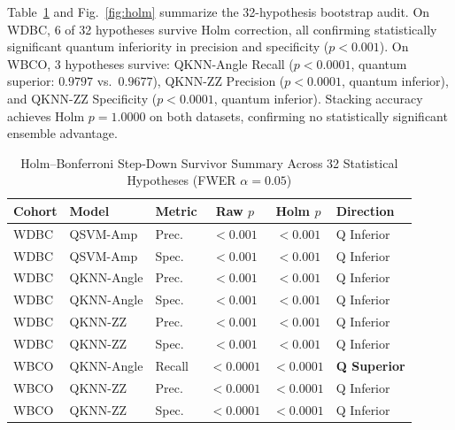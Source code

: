 \documentclass[journal,twocolumn]{IEEEtran}
\begin{document}
Table~\ref{tab:holm} and Fig.~\ref{fig:holm} summarize the 32-hypothesis bootstrap audit. On WDBC, 6 of 32 hypotheses survive Holm correction, all confirming statistically significant quantum inferiority in precision and specificity ($p < 0.001$). On WBCO, 3 hypotheses survive: QKNN-Angle Recall ($p < 0.0001$, quantum superior: $0.9797$ vs.\ $0.9677$), QKNN-ZZ Precision ($p < 0.0001$, quantum inferior), and QKNN-ZZ Specificity ($p < 0.0001$, quantum inferior). Stacking accuracy achieves Holm $p = 1.0000$ on both datasets, confirming no statistically significant ensemble advantage.

\begin{table}[!t]
\caption{Holm--Bonferroni Step-Down Survivor Summary Across 32 Statistical Hypotheses (FWER $\alpha = 0.05$)}
\label{tab:holm}
\centering
\scriptsize
\setlength{\tabcolsep}{2.5pt}
\renewcommand{\arraystretch}{1.15}
\begin{tabular}{l l l c c l}
\toprule
\textbf{Cohort} & \textbf{Model} & \textbf{Metric} & \textbf{Raw $p$} & \textbf{Holm $p$} & \textbf{Direction} \\
\midrule
WDBC & QSVM-Amp   & Prec.  & $<0.001$  & $<0.001$  & Q Inferior \\
WDBC & QSVM-Amp   & Spec.  & $<0.001$  & $<0.001$  & Q Inferior \\
WDBC & QKNN-Angle & Prec.  & $<0.001$  & $<0.001$  & Q Inferior \\
WDBC & QKNN-Angle & Spec.  & $<0.001$  & $<0.001$  & Q Inferior \\
WDBC & QKNN-ZZ    & Prec.  & $<0.001$  & $<0.001$  & Q Inferior \\
WDBC & QKNN-ZZ    & Spec.  & $<0.001$  & $<0.001$  & Q Inferior \\
\midrule
WBCO & QKNN-Angle & Recall & $<0.0001$ & $<0.0001$ & \textbf{Q Superior} \\
WBCO & QKNN-ZZ    & Prec.  & $<0.0001$ & $<0.0001$ & Q Inferior \\
WBCO & QKNN-ZZ    & Spec.  & $<0.0001$ & $<0.0001$ & Q Inferior \\
\bottomrule
\end{tabular}
\end{table}
\end{document}
